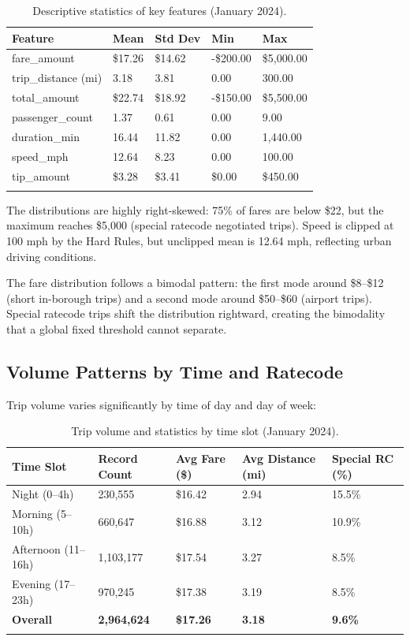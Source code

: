 \begin{longtable}{|m{3.5cm}|R{2.5cm}|R{2.5cm}|R{2.5cm}|R{2.5cm}|}
\hline
\textbf{Feature} & \textbf{Mean} & \textbf{Std Dev} & \textbf{Min} & \textbf{Max} \\ \hline
fare\_amount & \$17.26 & \$14.62 & -\$200.00 & \$5,000.00 \\ \hline
trip\_distance (mi) & 3.18 & 3.81 & 0.00 & 300.00 \\ \hline
total\_amount & \$22.74 & \$18.92 & -\$150.00 & \$5,500.00 \\ \hline
passenger\_count & 1.37 & 0.61 & 0.00 & 9.00 \\ \hline
duration\_min & 16.44 & 11.82 & 0.00 & 1,440.00 \\ \hline
speed\_mph & 12.64 & 8.23 & 0.00 & 100.00 \\ \hline
tip\_amount & \$3.28 & \$3.41 & \$0.00 & \$450.00 \\ \hline
\caption{Descriptive statistics of key features (January 2024).}
\label{tab:dataset_stats}
\end{longtable}

The distributions are highly right-skewed: 75\% of fares are below \$22, but the maximum reaches \$5,000 (special ratecode negotiated trips). Speed is clipped at 100 mph by the Hard Rules, but unclipped mean is 12.64 mph, reflecting urban driving conditions.

The fare distribution follows a bimodal pattern: the first mode around \$8--\$12 (short in-borough trips) and a second mode around \$50--\$60 (airport trips). Special ratecode trips shift the distribution rightward, creating the bimodality that a global fixed threshold cannot separate.

\subsection{Volume Patterns by Time and Ratecode}

Trip volume varies significantly by time of day and day of week:

\begin{longtable}{|m{2.5cm}|R{2.5cm}|R{2.5cm}|R{3cm}|R{3cm}|}
\hline
\textbf{Time Slot} & \textbf{Record Count} & \textbf{Avg Fare (\$)} & \textbf{Avg Distance (mi)} & \textbf{Special RC (\%)} \\ \hline
Night (0--4h) & 230,555 & \$16.42 & 2.94 & 15.5\% \\ \hline
Morning (5--10h) & 660,647 & \$16.88 & 3.12 & 10.9\% \\ \hline
Afternoon (11--16h) & 1,103,177 & \$17.54 & 3.27 & 8.5\% \\ \hline
Evening (17--23h) & 970,245 & \$17.38 & 3.19 & 8.5\% \\ \hline
\textbf{Overall} & \textbf{2,964,624} & \textbf{\$17.26} & \textbf{3.18} & \textbf{9.6\%} \\ \hline
\caption{Trip volume and statistics by time slot (January 2024).}
\label{tab:timeslot_stats}
\end{longtable}

